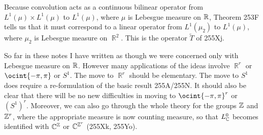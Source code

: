 {Because convolution acts as a continuous bilinear operator from
$L^1(\mu)\times L^1(\mu)$ to $L^1(\mu)$, where $\mu$ is Lebesgue measure
on $\Bbb R$, Theorem 253F tells us that it must correspond to a linear
operator from $L^1(\mu_2)$ to $L^1(\mu)$, where $\mu_2$ is Lebesgue
measure on $\BbbR^2$.  This is the operator $\tilde T$ of 255Xj.

So far in these notes I have written as though we were concerned only
with Lebesgue measure on $\Bbb R$.   However many applications of the
ideas involve $\BbbR^r$ or $\ocint{-\pi,\pi}$ or $S^1$.   The move to
$\BbbR^r$ should be elementary.   The move to $S^1$ does require a
re-formulation of the basic result 255A/255N.   It should also be clear
that there will be no new difficulties in moving to $\ocint{-\pi,\pi}^r$
or $(S^1)^r$.   Moreover, we can also go through the whole theory for
the groups $\Bbb Z$ and $\Bbb Z^r$, where the appropriate measure is now
counting measure, so that $L^0_{\Bbb C}$ becomes identified with
$\Bbb C^{\Bbb Z}$ or $\Bbb C^{\Bbb Z^r}$ (255Xk, 255Yo).


}%

\discrpage

